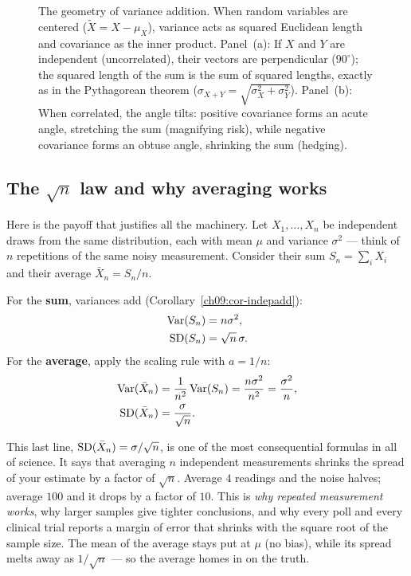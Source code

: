 \begin{figure}[H]
\caption{The geometry of variance addition. When random variables are centered
($\tilde X = X-\mu_X$), variance acts as squared Euclidean length and covariance
as the inner product. Panel~(a): If $X$ and $Y$ are independent (uncorrelated),
their vectors are perpendicular ($90^\circ$); the squared length of the sum is the sum
of squared lengths, exactly as in the Pythagorean theorem ($\sigma_{X+Y} = \sqrt{\sigma_X^2 + \sigma_Y^2}$).
Panel~(b): When correlated, the angle tilts: positive covariance forms an acute angle,
stretching the sum (magnifying risk), while negative covariance forms an obtuse angle,
shrinking the sum (hedging).}
\label{ch09:fig-pythagoras}
\end{figure}

\subsection{The \texorpdfstring{$\sqrt{n}$}{sqrt(n)} law and why averaging works}

Here is the payoff that justifies all the machinery. Let $X_1, \dots, X_n$ be
independent draws from the same distribution, each with mean $\mu$ and
variance $\sigma^2$ --- think of $n$ repetitions of the same noisy
measurement. Consider their sum $S_n = \sum_i X_i$ and their average
$\bar X_n = S_n / n$.

For the \textbf{sum}, variances add (Corollary~\ref{ch09:cor-indepadd}):
\begin{align*}
  \operatorname{Var}(S_n) &= n\sigma^2, \\
  \operatorname{SD}(S_n) &= \sqrt{n}\,\sigma.
\end{align*}
For the \textbf{average}, apply the scaling rule with $a = 1/n$:
\begin{align*}
  \operatorname{Var}(\bar X_n) &= \frac{1}{n^2}\operatorname{Var}(S_n) = \frac{n\sigma^2}{n^2} = \frac{\sigma^2}{n}, \\
  \operatorname{SD}(\bar X_n) &= \frac{\sigma}{\sqrt{n}}.
\end{align*}

\begin{aestheticbox}
This last line, $\operatorname{SD}(\bar X_n) = \sigma/\sqrt{n}$, is one of the most
consequential formulas in all of science. It says that averaging $n$
independent measurements shrinks the spread of your estimate by a factor of
$\sqrt{n}$. Average $4$ readings and the noise halves; average $100$ and it
drops by a factor of $10$. This is \emph{why repeated measurement works}, why
larger samples give tighter conclusions, and why every poll and every clinical
trial reports a margin of error that shrinks with the square root of the
sample size. The mean of the average stays put at $\mu$ (no bias), while its
spread melts away as $1/\sqrt{n}$ --- so the average homes in on the truth.
\end{aestheticbox}


